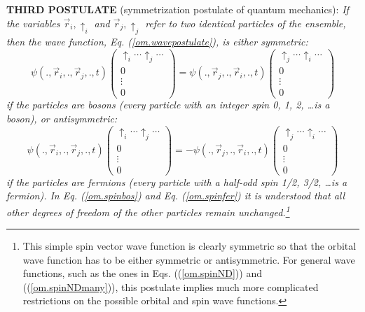 \documentclass[onecolumn,nofootinbib, secnumarabic, amsmath, nobibnotes,12pt,aps,pra]{revtex4-1}
\newcommand{\pref}[1]{(\ref{#1})}
\newcommand{\eref}[1]{Eq. (\ref{#1})}
\begin{document}
\noindent\textbf{THIRD POSTULATE} (symmetrization postulate of quantum mechanics): \textit{If the variables $\vec r_i,\uparrow_i$ and $\vec r_j,\uparrow_j$ refer to two identical particles of the ensemble, then the wave function, \eref{om.wavepostulate}, is either symmetric:
\begin{equation}
\label{om.spinbos}
\psi(.,\vec r_i,.,\vec r_j,.,t)\!\!\left(
\begin{array}{c}
\uparrow_i\ldots \uparrow_j\ldots\\ 0 \\\vdots\\ 0
\end{array}
\right) = \psi(.,\vec r_j,.,\vec r_i,.,t)\left(
\begin{array}{c}
\uparrow_j\ldots \uparrow_i\ldots\\ 0 \\\vdots\\ 0
\end{array}
\right)
\end{equation}
if the particles are bosons (every particle with an integer spin 0, 1, 2, \ldots is a boson), or antisymmetric:
\begin{equation}
\label{om.spinfer} \psi(.,\vec r_i,.,\vec r_j,.,t)\!\!\left(
\begin{array}{c}
\uparrow_i\ldots \uparrow_j\ldots\\ 0 \\\vdots\\ 0
\end{array}
\right)\!\! = -\psi(.,\vec r_j,.,\vec r_i,.,t)\!\!\left(
\begin{array}{c}
\uparrow_j\ldots \uparrow_i\ldots\\ 0 \\ \vdots \\ 0
\end{array}
\right)
\end{equation}
if the particles are fermions (every particle with a half-odd spin 1/2, 3/2, \ldots is a fermion). In \eref{om.spinbos} and \eref{om.spinfer} it is understood that all other degrees of freedom of the other particles remain unchanged.\footnote{This simple spin vector wave function is clearly symmetric so that the orbital wave function has to be either symmetric or antisymmetric. For general wave functions, such as the ones in Eqs. (\pref{om.spinND}) and (\pref{om.spinNDmany}), this postulate implies much more complicated restrictions on the possible orbital and spin wave functions.}} \\
\end{document}
